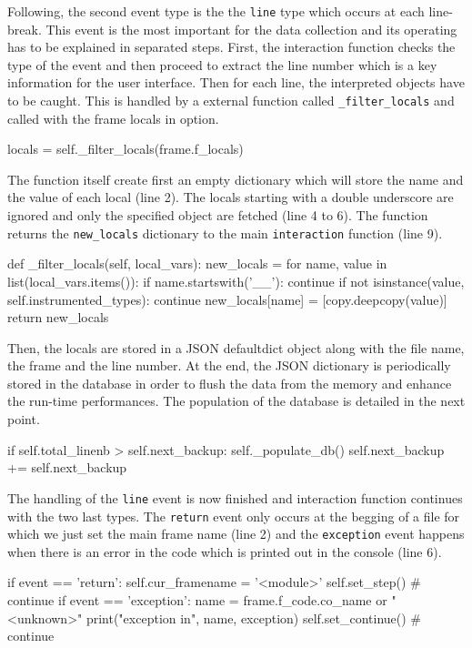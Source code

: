 Following, the second event type is the the \texttt{line} type which occurs at each line-break. This event is the most important for the data collection and its operating has to be explained in separated steps. First, the interaction function checks the type of the event and then proceed to extract the line number which is a key information for the user interface. Then for each line, the interpreted objects have to be caught. This is handled by a external function called \texttt{\_filter\_locals} and called with the frame locals in option.
\begin{python}
locals = self._filter_locals(frame.f_locals)
\end{python}

The function itself create first an empty dictionary which will store the name and the value of each local (line 2). The locals starting with a double underscore are ignored and only the specified object are fetched (line 4 to 6). The function returns the \texttt{new\_locals} dictionary to the main \texttt{interaction} function (line 9).

\begin{python}
def _filter_locals(self, local_vars):
    new_locals = {}
    for name, value in list(local_vars.items()):
        if name.startswith('__'):
            continue
        if not isinstance(value, self.instrumented_types):
            continue
        new_locals[name] = [copy.deepcopy(value)]
    return new_locals

\end{python}

Then, the locals are stored in a JSON defaultdict object along with the file name, the frame and the line number. At the end, the JSON dictionary is periodically stored in the database in order to flush the data from the memory and enhance the run-time performances. The population of the database is detailed in the next point.

\begin{python}
if self.total_linenb > self.next_backup:
    self._populate_db()
    self.next_backup += self.next_backup
\end{python}

The handling of the \texttt{line} event is now finished and interaction function continues with the two last types. The \texttt{return} event only occurs at the begging of a file for which we just set the main frame name (line 2) and the \texttt{exception} event happens when there is an error in the code which is printed out in the console (line 6).
\begin{python}
if event == 'return':
    self.cur_framename = '<module>'
    self.set_step()  # continue
if event == 'exception':
    name = frame.f_code.co_name or "<unknown>"
    print("exception in", name, exception)
    self.set_continue()  # continue
\end{python}

